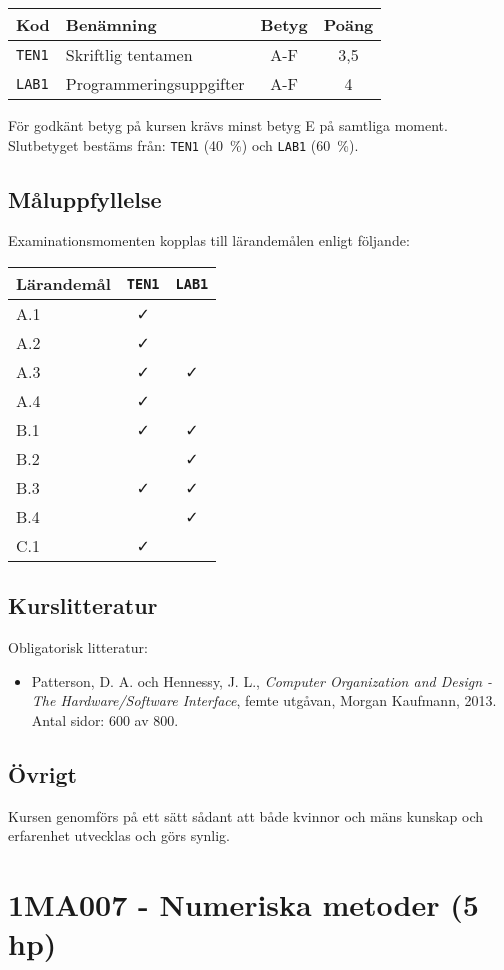 \begin{longtable}[]{@{}llcc@{}}
\toprule
\textsf{Kod} & \textsf{Benämning} & \textsf{Betyg} & \textsf{Poäng}\tabularnewline
\midrule
\endhead
\texttt{TEN1} & Skriftlig tentamen & A-F & 3,5\tabularnewline
\texttt{LAB1} & Programmeringsuppgifter & A-F & 4\tabularnewline
\bottomrule
\end{longtable}

För godkänt betyg på kursen krävs minst betyg E på samtliga moment.
Slutbetyget bestäms från: \texttt{TEN1} (40~\%) och \texttt{LAB1} (60~\%).

\subsection*{Måluppfyllelse}

Examinationsmomenten kopplas till lärandemålen enligt följande:

\begin{longtable}[]{@{}lcc@{}}
\toprule
\textsf{Lärandemål} & \texttt{TEN1} & \texttt{LAB1}\tabularnewline
\midrule
\endhead
A.1 & \faCheck &\tabularnewline
A.2 & \faCheck &\tabularnewline
A.3 & \faCheck & \faCheck\tabularnewline
A.4 & \faCheck &\tabularnewline
B.1 & \faCheck & \faCheck\tabularnewline
B.2 & & \faCheck\tabularnewline
B.3 & \faCheck & \faCheck\tabularnewline
B.4 & & \faCheck\tabularnewline
C.1 & \faCheck &\tabularnewline
\bottomrule
\end{longtable}

\subsection*{Kurslitteratur}

Obligatorisk litteratur:

\begin{itemize}
\tightlist
\item
  Patterson, D. A. och Hennessy, J. L., \emph{Computer Organization and
  Design - The Hardware/Software Interface}, femte utgåvan, Morgan
  Kaufmann, 2013. Antal sidor: 600 av 800.
\end{itemize}

\subsection*{Övrigt}

Kursen genomförs på ett sätt sådant att både kvinnor och mäns kunskap och erfarenhet utvecklas och görs synlig.
\pagebreak
\section*{1MA007 - Numeriska metoder (5 hp)}

